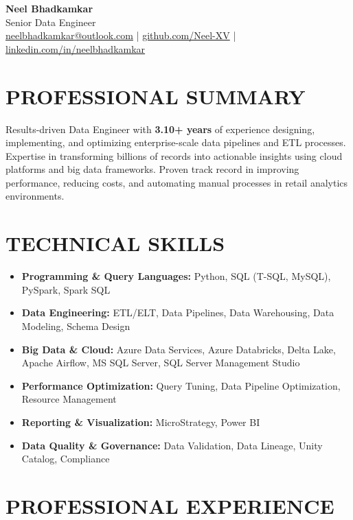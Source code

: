 \documentclass[10pt,letterpaper]{article}
\begin{document}
\begin{center}
    {\Large\bfseries Neel Bhadkamkar} \\[2pt]
    {\normalsize Senior Data Engineer} \\[4pt]
    \href{mailto:neelbhadkamkar@outlook.com}{neelbhadkamkar@outlook.com} | 
    \href{https://github.com/Neel-XV}{github.com/Neel-XV} | 
    \href{https://linkedin.com/in/neelbhadkamkar}{linkedin.com/in/neelbhadkamkar}
\end{center}

\section{PROFESSIONAL SUMMARY}
\noindent Results-driven Data Engineer with \textbf{3.10+ years} of experience designing, implementing, and optimizing enterprise-scale data pipelines and ETL processes. Expertise in transforming billions of records into actionable insights using cloud platforms and big data frameworks. Proven track record in improving performance, reducing costs, and automating manual processes in retail analytics environments.

\section{TECHNICAL SKILLS}
\begin{itemize}[leftmargin=*,nosep,itemsep=2pt]
    \item \textbf{Programming \& Query Languages:} Python, SQL (T-SQL, MySQL), PySpark, Spark SQL
    \item \textbf{Data Engineering:} ETL/ELT, Data Pipelines, Data Warehousing, Data Modeling, Schema Design
    \item \textbf{Big Data \& Cloud:} Azure Data Services, Azure Databricks, Delta Lake, Apache Airflow, MS SQL Server, SQL Server Management Studio
    \item \textbf{Performance Optimization:} Query Tuning, Data Pipeline Optimization, Resource Management
    \item \textbf{Reporting \& Visualization:} MicroStrategy, Power BI
    \item \textbf{Data Quality \& Governance:} Data Validation, Data Lineage, Unity Catalog, Compliance
\end{itemize}

\section{PROFESSIONAL EXPERIENCE}
\end{document}
